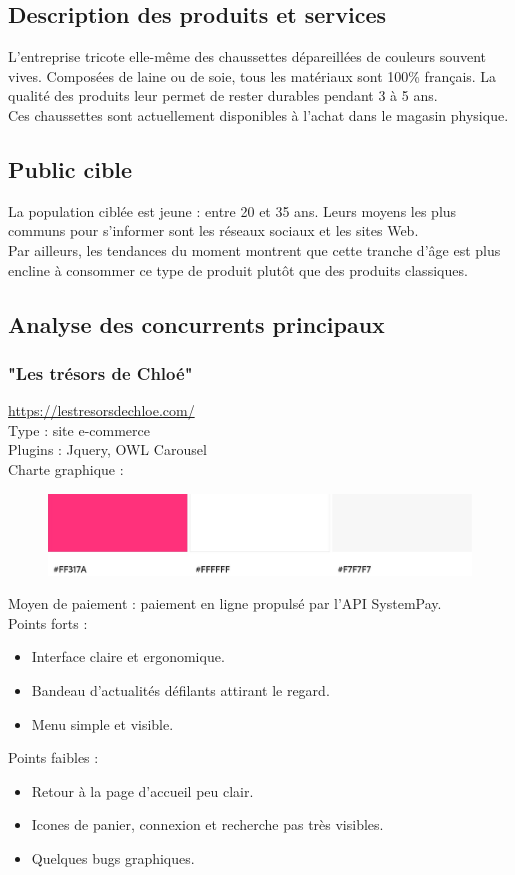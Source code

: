 \documentclass[a4paper, 12pt]{article}
\begin{document}
\subsection{Description des produits et services}
L'entreprise tricote elle-même des chaussettes dépareillées de couleurs souvent vives. Composées de laine ou de soie, tous les matériaux sont 100\% français. La qualité des produits leur permet de rester durables pendant 3 à 5 ans.\\
Ces chaussettes sont actuellement disponibles à l'achat dans le magasin physique.
\subsection{Public cible}
La population ciblée est jeune : entre 20 et 35 ans. Leurs moyens les plus communs pour s'informer sont les réseaux sociaux et les sites Web.\\
Par ailleurs, les tendances du moment montrent que cette tranche d'âge est plus encline à consommer ce type de produit plutôt que des produits classiques.
\subsection{Analyse des concurrents principaux}
\subsubsection{"Les trésors de Chloé"}
\url{https://lestresorsdechloe.com/}\\
Type : site e-commerce\\
Plugins : Jquery, OWL Carousel\\
Charte graphique :
\begin{figure}[H]
    \centering
    \includegraphics[scale=0.4]{theme_chloe.jpeg}
\end{figure}
Moyen de paiement : paiement en ligne propulsé par l'API SystemPay.\\
Points forts :
\begin{itemize}
    \item Interface claire et ergonomique.
    \item Bandeau d'actualités défilants attirant le regard.
    \item Menu simple et visible.
\end{itemize}
Points faibles :
\begin{itemize}
    \item Retour à la page d'accueil peu clair.
    \item Icones de panier, connexion et recherche pas très visibles.
    \item Quelques bugs graphiques.
\end{itemize}
\end{document}
